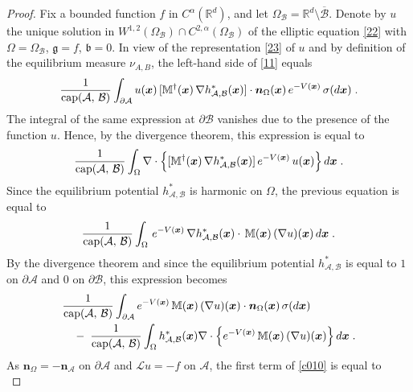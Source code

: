 \documentclass[reqno]{amsart}
\newcounter{as}[section]
\newcommand{\mc}[1]{{\mathcal #1}}
\newcommand{\mf}[1]{{\mathfrak #1}}
\newcommand{\bb}[1]{{\mathbb #1}}
\newcommand{\bs}[1]{{\boldsymbol #1}}
\newcommand{\<}{\langle}
\renewcommand{\>}{\rangle}
\renewcommand{\Cap}{{\rm cap}}
\begin{document}
\begin{proof}
Fix a bounded function $f$ in $C^\alpha (\bb R^d)$, and let $\Omega_\mc B
= \bb R^d \setminus \overline{\mc B}$. Denote by $u$ the unique solution
in $W^{1,2}(\Omega_\mc B) \cap C^{2,\alpha}(\Omega_\mc B)$ of the elliptic
equation \eqref{22} with $\Omega = \Omega_\mc B$, $\mf g = f$, $\mf b=0$.
In view of the representation \eqref{23} of $u$ and by definition of
the equilibrium measure $\nu_{A,B}$, the left-hand side of \eqref{11} equals
\begin{equation*}
\frac {1}{\Cap (\mc A,\,\mc B)} \int_{\partial \mc A} u(\bs{x})\, [\bb M^\dagger(\bs{x})\,
\nabla h^*_{\mc A,\mc B} (\bs{x}) ]
\cdot \bs n_{\Omega} (\bs{x}) \, e^{-V(\bs{x})} \, \sigma (d\bs{x}) \;.
\end{equation*}
The integral of the same expression at $\partial \mc B$ vanishes due to
the presence of the function $u$. Hence, by the divergence theorem,
this expression is equal to
\begin{equation*}
\frac {1} {\Cap (\mc A,\,\mc B)} \int_{\Omega} \nabla \cdot
\Big\{ [\bb M^\dagger(\bs{x})\, \nabla h^*_{\mc A,\mc B} (\bs{x}) ] \, e^{-V(\bs{x})} \, u(\bs{x})
\Big\} \, d\bs{x}  \;.
\end{equation*}
Since the equilibrium potential $h^*_{\mc A,\mc B}$ is harmonic on $\Omega$,
the previous equation is equal to
\begin{align*}
\frac {1} {\Cap (\mc A,\,\mc B)} \int_{\Omega}   \, e^{-V(\bs{x})} \,
\nabla h^*_{\mc A,\mc B} (\bs{x}) \cdot \, \bb M(\bs{x}) \, (\nabla u)(\bs{x}) \, d\bs{x} \;.
\end{align*}
By the divergence theorem and since the equilibrium potential
$h^*_{\mc A,\mc B}$ is equal to $1$ on $\partial \mc A$ and $0$ on $\partial \mc B$,
this expression becomes
\begin{equation}
\label{c010}
\begin{aligned}
& \frac {1} {\Cap (\mc A,\,\mc B)} \int_{\partial \mc A}
e^{-V(\bs{x})} \, \bb M(\bs{x}) \, (\nabla u)(\bs{x})  \cdot \bs
n_{\Omega}(\bs{x}) \, \sigma(d\bs{x}) \\
&\quad - \; \frac {1} {\Cap (\mc A,\,\mc B)} \int_{\Omega}
h^*_{\mc A,\mc B} (\bs{x})  \nabla \cdot \Big\{ e^{-V(\bs{x})} \, \bb M(\bs{x}) \,
(\nabla u)(\bs{x}) \Big\} \, d\bs{x} \;.
\end{aligned}
\end{equation}
As $\bs n_{\Omega} = - \bs n_{\mc A}$ on $\partial \mc A$ and $\mc L u = -f$
on $\mc A$, the first term of \eqref{c010} is equal to
\begin{equation*}

\end{equation*}
\end{proof}
\end{document}
